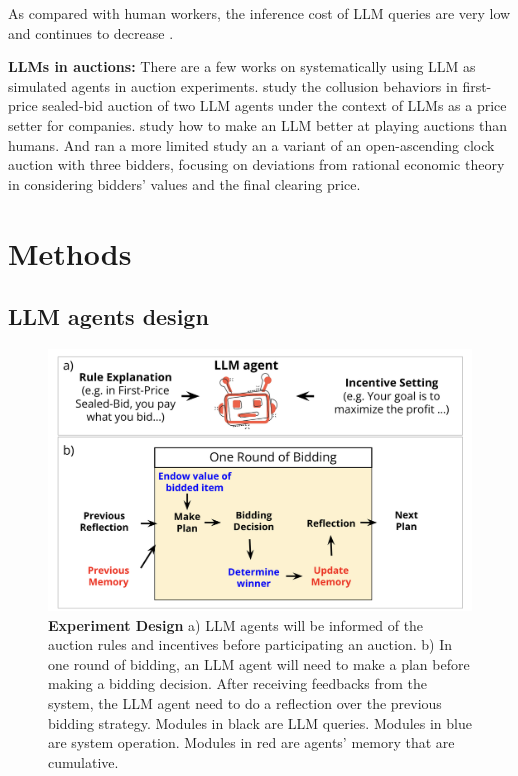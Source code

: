 \documentclass{article} %
\begin{document}
As compared with human workers, the inference cost of LLM queries are very low and continues to decrease \cite{achiam2023gpt,patel2023splitwise,bae2023complexitynet}.


\textbf{LLMs in auctions:}
There are a few works on systematically using LLM as simulated agents in auction experiments.
\citet{fish2024algorithmic} study the collusion behaviors in first-price sealed-bid auction of two LLM agents
 under the context of LLMs as a price setter for companies. 
\citet{chen2023put} study how to make an LLM better at playing auctions than humans.
And \citet{manning2024automated} ran a more limited study an  a variant of an open-ascending clock auction with three bidders, focusing on deviations from rational economic theory in considering bidders' values and the final clearing price.





\section{Methods}

\subsection{LLM agents design}

\begin{figure}[h]
    \centering \includegraphics[width=\linewidth]{Figs/agent.png}
    \caption{\textbf{Experiment Design} a) LLM agents will be informed of the auction rules and incentives before participating an auction. b) In one round of bidding, an LLM agent will need to make a plan before making a bidding decision. After receiving feedbacks from the system, the LLM agent need to do a reflection over the previous bidding strategy. Modules in black are LLM queries. Modules in blue are system operation. Modules in red are agents' memory that are cumulative.}
    \label{fig:design}
\end{figure}
\end{document}
